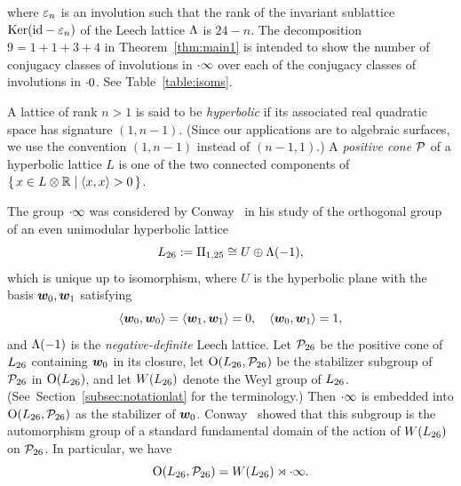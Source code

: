 \documentclass{amsart} %
\begin{document}
where $\varepsilon_n$ is an involution such that the rank of 
the invariant sublattice 
$\operatorname{Ker}(\mathord{\mathrm{id}}-\varepsilon_n)$ of the Leech lattice $\Lambda$ is $24-n$.
The decomposition $9=1+1+3+4$ in Theorem~\ref{thm:main1} 
is intended to show the number of conjugacy classes of involutions in $\cdot \infty$
over each of the conjugacy classes of involutions in $\cdot 0$.
See Table~\ref{table:isoms}.
\par
%
A lattice of rank 
$n>1$
 is said to be \emph{hyperbolic} if its associated real quadratic space has signature $(1,n-1)$.
 (Since our applications are to algebraic surfaces, we use the convention $(1,n-1)$ instead of $(n-1,1)$.)
A \emph{positive cone} $\mathord{\mathcal{P}}$ of a hyperbolic lattice $L$
is one of the two connected components 
of $\{\,{x\in L\otimes \mathord{\mathbb{R}}}\mid {\langle x, x \rangle > 0} \,\}$.
\par
The group $\cdot \infty$ was considered by Conway~\cite{MR690711}
 in his study of the orthogonal group of an even unimodular hyperbolic lattice
 \[
 L_{26}:=\mathrm{II}_{1,25} \cong U\oplus \Lambda(-1), 
\]
which is unique up to isomorphism,
where $U$ is the hyperbolic plane with the basis $\boldsymbol{w}_0, \boldsymbol{w}_1$
satisfying 
%
\begin{equation}\label{eq:w0w1}
\langle \boldsymbol{w}_0, \boldsymbol{w}_0 \rangle=\langle \boldsymbol{w}_1, \boldsymbol{w}_1 \rangle=0, 
\quad \langle \boldsymbol{w}_0, \boldsymbol{w}_1 \rangle=1, 
\end{equation}
%
and $\Lambda(-1)$ is the \emph{negative-definite} Leech lattice.
Let $\mathord{\mathcal{P}}_{26}$ be 
the positive cone of $L_{26}$ containing $\boldsymbol{w}_0$ in its closure, 
let $\mathord{\mathrm{O}}(L_{26}, \mathord{\mathcal{P}}_{26})$ be the stabilizer subgroup of $\mathord{\mathcal{P}}_{26}$ in $\mathord{\mathrm{O}}(L_{26})$, 
and 
let $W(L_{26})$ denote the Weyl group of $L_{26}$.
(See~Section~\ref{subsec:notationlat} for the terminology.)
Then $\cdot \infty$ is embedded into $\mathord{\mathrm{O}}(L_{26}, \mathord{\mathcal{P}}_{26})$
as the stabilizer of $\boldsymbol{w}_0$.
Conway~\cite{MR690711} showed that 
 this subgroup is
the automorphism group
of a standard fundamental domain of the action of $W(L_{26})$ on $\mathord{\mathcal{P}}_{26}$.
In particular, we have 
\[
\mathord{\mathrm{O}}(L_{26}, \mathord{\mathcal{P}}_{26})= W(L_{26}) \rtimes\cdot \infty.
\]
\end{document}

